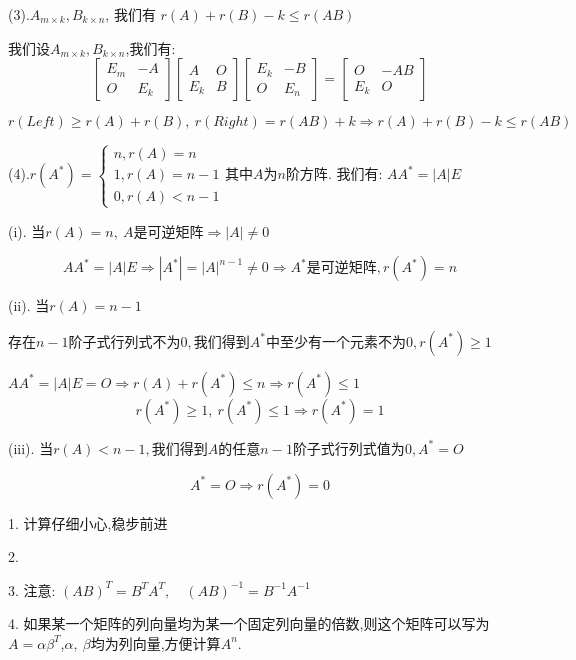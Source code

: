 \begin{anymark}[证明]
(3).$A_{m\times k},B_{k\times n}$, 我们有 $r(A)+r(B)-k\leq r(AB)$

我们设$A_{m\times k},B_{k\times n}$,我们有:  
$$\left[
\begin{matrix}
	E_{m}&-A\\
	O&E_{k}
\end{matrix}
\right]\left[
\begin{matrix}
	A&O\\
	E_{k}&B
\end{matrix}
\right]\left[
\begin{matrix}
	E_{k}&-B\\
	O&E_{n}
\end{matrix}
\right]=\left[
\begin{matrix}
	O&-AB\\
	E_{k}&O
\end{matrix}
\right]$$

$$r(Left)\geq r(A)+r(B),\ r(Right)=r(AB)+k\Rightarrow r(A)+r(B)-k\leq r(AB)$$

(4).$r(A^{*})=\left\lbrace 
\begin{array}{l}
	n,r(A)=n\\
	1,r(A)=n-1\\
	0,r(A)<n-1
\end{array}
\right. \text{其中}A\text{为}n\text{阶方阵}.$
我们有:  $AA^{*}=|A|E$

(i). $\text{当}r(A)=n,\ A\text{是可逆矩阵}\Rightarrow |A|\neq 0$

$$AA^{*}=|A|E\Rightarrow |A^{*}|=|A|^{n-1}\neq 0\Rightarrow A^{*}\text{是可逆矩阵},r(A^{*})=n$$

(ii). $\text{当}r(A)=n-1$

$\text{存在}n-1\text{阶子式行列式不为}0,\text{我们得到}A^{*}\text{中至少有一个元素不为}0,r(A^{*})\geq 1$

$AA^{*}=|A|E=O\Rightarrow r(A)+r(A^{*})\leq n\Rightarrow r(A^{*})\leq 1$
$$r(A^{*})\geq 1,\ r(A^{*})\leq 1\Rightarrow r(A^{*})=1$$

(iii). $\text{当}r(A)<n-1,\text{我们得到}A\text{的任意}n-1\text{阶子式行列式值为}0,A^{*}=O$

$$A^{*}=O\Rightarrow r(A^{*})=0$$

\end{anymark}
\begin{anymark}[总结]
	1. 计算仔细小心,稳步前进
	
	2. 
	
	3. 注意:  $(AB)^{T}=B^{T}A^{T},\quad (AB)^{-1}=B^{-1}A^{-1}$
	
	4. 如果某一个矩阵的列向量均为某一个固定列向量的倍数,则这个矩阵可以写为$A=\alpha\beta^{T}$,$\alpha,\ \beta$均为列向量,方便计算$A^{n}$.
	
\end{anymark}
